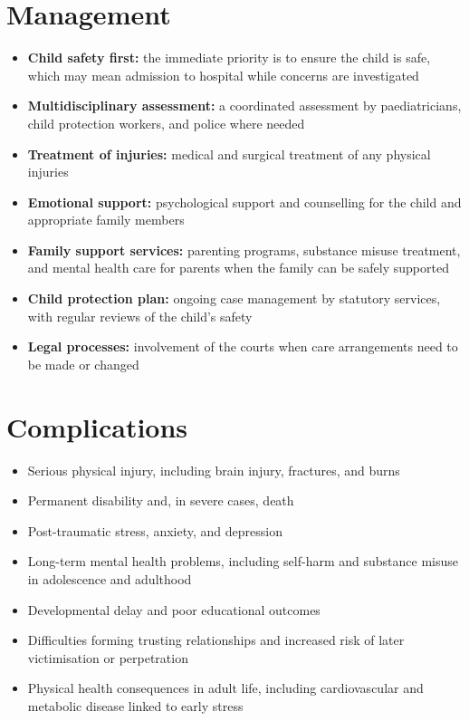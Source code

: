 \section*{Management}
\begin{itemize}
    \item \textbf{Child safety first:} the immediate priority is to ensure the child is safe, which may mean admission to hospital while concerns are investigated
    \item \textbf{Multidisciplinary assessment:} a coordinated assessment by paediatricians, child protection workers, and police where needed
    \item \textbf{Treatment of injuries:} medical and surgical treatment of any physical injuries
    \item \textbf{Emotional support:} psychological support and counselling for the child and appropriate family members
    \item \textbf{Family support services:} parenting programs, substance misuse treatment, and mental health care for parents when the family can be safely supported
    \item \textbf{Child protection plan:} ongoing case management by statutory services, with regular reviews of the child's safety
    \item \textbf{Legal processes:} involvement of the courts when care arrangements need to be made or changed
\end{itemize}

\section*{Complications}
\begin{itemize}
    \item Serious physical injury, including brain injury, fractures, and burns
    \item Permanent disability and, in severe cases, death
    \item Post-traumatic stress, anxiety, and depression
    \item Long-term mental health problems, including self-harm and substance misuse in adolescence and adulthood
    \item Developmental delay and poor educational outcomes
    \item Difficulties forming trusting relationships and increased risk of later victimisation or perpetration
    \item Physical health consequences in adult life, including cardiovascular and metabolic disease linked to early stress
\end{itemize}

